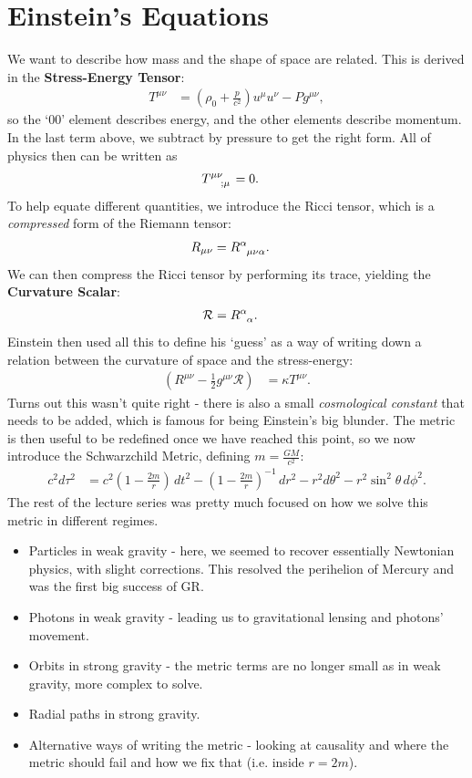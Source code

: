 \documentclass[a4paper, 11pt, normalem]{report}
\begin{document}
\section{Einstein's Equations}
We want to describe how mass and the shape of space are related.
This is derived in the \textbf{Stress-Energy Tensor}:
\begin{align}
    T^{\mu\nu} &= \left(\rho_0+\frac{p}{c^2}\right)u^\mu u^\nu - Pg^{\mu\nu},
\end{align}
so the `00' element describes energy, and the other elements describe momentum.
In the last term above, we subtract by pressure to get the right form.
All of physics then can be written as
\begin{align}
    \tensor{T}{^{\mu\nu}_{;\mu}} &= 0.
\end{align}
To help equate different quantities, we introduce the Ricci tensor, which is a \emph{compressed} form of the Riemann tensor:
\begin{align}
    R_{\mu\nu} &= \tensor{R}{^\alpha_{\mu\nu\alpha}}.
\end{align}
We can then compress the Ricci tensor by performing its trace, yielding the \textbf{Curvature Scalar}:
\begin{align}
    \mathcal{R} &= \tensor{R}{^\alpha_\alpha}.
\end{align}
Einstein then used all this to define his `guess' as a way of writing down a relation between the curvature of space and the stress-energy:
\begin{align}
    \left(R^{\mu\nu}-\frac12 g^{\mu\nu}\mathcal{R}\right) &= \kappa T^{\mu\nu}.
\end{align}
Turns out this wasn't quite right - there is also a small \emph{cosmological constant} that needs to be added, which is famous for being Einstein's big blunder.
The metric is then useful to be redefined once we have reached this point, so we now introduce the Schwarzchild Metric, defining $m=\frac{GM}{c^2}$:
\begin{align}
    c^2d\tau^2 &= c^2\left(1-\frac{2m}{r}\right)\,dt^2 - \left(1-\frac{2m}{r}\right)^{-1}\,dr^2 - r^2d\theta^2 - r^2\sin^2\theta\,d\phi^2.
\end{align}
The rest of the lecture series was pretty much focused on how we solve this metric in different regimes.
\begin{itemize}
    \item Particles in weak gravity - here, we seemed to recover essentially Newtonian physics, with slight corrections. This resolved the perihelion of Mercury and was the first big success of GR.
    \item Photons in weak gravity - leading us to gravitational lensing and photons' movement.
    \item Orbits in strong gravity - the metric terms are no longer small as in weak gravity, more complex to solve.
    \item Radial paths in strong gravity.
    \item Alternative ways of writing the metric - looking at causality and where the metric should fail and how we fix that (i.e. inside $r=2m$).
\end{itemize}
\end{document}
